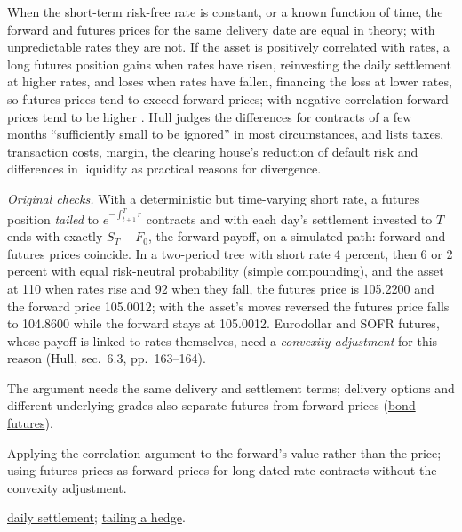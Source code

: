 \begin{qfresult}\label{res:forward-futures-price-difference}
 When the short-term risk-free rate is constant, or a known function of time, the forward and futures prices for the same delivery date are equal in theory; with unpredictable rates they are not. If the asset is positively correlated with rates, a long futures position gains when rates have risen, reinvesting the daily settlement at higher rates, and loses when rates have fallen, financing the loss at lower rates, so futures prices tend to exceed forward prices; with negative correlation forward prices tend to be higher \citep[chap.~5, sec.~5.8, p.~135]{s7-hulloptions}. Hull judges the differences for contracts of a few months ``sufficiently small to be ignored'' in most circumstances, and lists taxes, transaction costs, margin, the clearing house's reduction of default risk and differences in liquidity as practical reasons for divergence.

 \emph{Original checks.} With a deterministic but time-varying short rate, a futures position \emph{tailed} to $e^{-\int_{t+1}^{T}r}$ contracts and with each day's settlement invested to $T$ ends with exactly $S_T-F_0$, the forward payoff, on a simulated path: forward and futures prices coincide. In a two-period tree with short rate 4 percent, then 6 or 2 percent with equal risk-neutral probability (simple compounding), and the asset at 110 when rates rise and 92 when they fall, the futures price is 105.2200 and the forward price 105.0012; with the asset's moves reversed the futures price falls to 104.8600 while the forward stays at 105.0012. Eurodollar and SOFR futures, whose payoff is linked to rates themselves, need a \emph{convexity adjustment} for this reason (Hull, sec.~6.3, pp.~163--164).

 The argument needs the same delivery and settlement terms; delivery options and different underlying grades also separate futures from forward prices (\hyperref[meth:rate-bond-forward-valuation]{bond futures}).

 Applying the correlation argument to the forward's value rather than the price; using futures prices as forward prices for long-dated rate contracts without the convexity adjustment.

 \hyperref[mech:futures-margin-settlement]{daily settlement}; \hyperref[def:futures-hedge-basis]{tailing a hedge}.

\end{qfresult}

